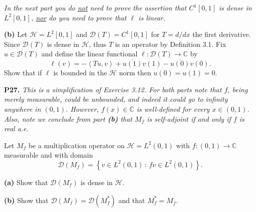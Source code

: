 \documentclass[12pt]{amsart}
\newcommand{\cD}{\mathcal{D}}
\newcommand{\cH}{\mathcal{H}}
\newcommand{\CC}{\mathbb{C}}
\newcommand{\ip}[2]{\ensuremath{\left<#1,#2\right>}}
\newcommand{\prob}[1]{\bigskip\noindent\textbf{#1.}\quad }
\newcommand{\epart}[1]{\medskip\noindent\textbf{(#1)}\quad }
\begin{document}
\clearpage\newpage
\noindent \emph{In the next part you do \underline{not} need to prove the assertion that $C^1[0,1]$ is dense in $L^2[0,1]$, \underline{nor} do you need to prove that $\ell$ is linear.}

\epart{b} Let $\cH=L^2[0,1]$ and $\cD(T) = C^1[0,1]$ for $T = d/dx$ the first derivative.  Since $\cD(T)$ is dense in $\cH$, thus $T$ is an operator by Definition 3.1.  Fix $u\in\cD(T)$ and define the linear functional $\ell:\cD(T)\to\CC$ by
	$$\ell(v) = - \ip{Tu}{v} + \overline{u(1)} v(1) - \overline{u(0)} v(0).$$
Show that if $\ell$ is bounded in the $\cH$ norm then $u(0)=u(1)=0$.


\prob{P27}  \emph{This is a simplification of Exercise 3.12.  For both parts note that $f$, being merely measurable, could be unbounded, and indeed it could go to infinity anywhere in $(0,1)$.  However, $f(x)\in\CC$ is well-defined for every $x\in(0,1)$.  Also, note we conclude from part \emph{\textbf{(b)}} that $M_f$ is self-adjoint if and only if $f$ is real a.e.}

\medskip \noindent Let $M_f$ be a multiplication operator on $\cH=L^2(0,1)$ with $f:(0,1)\to\CC$ measurable and with domain
	$$\cD(M_f) = \left\{v \in L^2(0,1)\,:\,fv \in L^2(0,1)\right\}.$$

\epart{a}  Show that $\cD(M_f)$ is dense in $\cH$.

\epart{b}  Show that $\cD(M_f) = \cD(M_f^*)$ and that $M_f^* = M_{\overline{f}}$.
\end{document}
